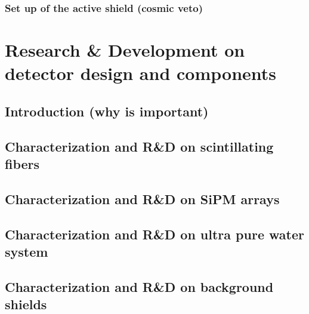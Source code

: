 \documentclass[12pt,a4paper]{book}
\begin{document}
		\subsection[Set up Active veto]{Set up of the active shield (cosmic veto)} %
		\label{subsec:SetUpActiveShield}
		\newpage
					
\chapter[Research \& Development]{Research \& Development on detector design and components}\label{chap:ResearchandDevelopment}
	\section{Introduction (why is important)}
	 \label{sec:IntroCharacterisation}
	\newpage
	
	\section[Characetrization fibers]{Characterization and R\&D on scintillating fibers}
	\label{sec:CharacterizationScintillatingFibers}
	\newpage
		
	\section[Characterization SiPM arrays]{Characterization and R\&D on SiPM arrays}
	\label{sec:CharacterizationSiPM}
	\newpage
	
	\section[Characetrization water system]{Characterization and R\&D on ultra pure water system}
	\label{sec:CharacterizationUltraPureWaterSystem}
	\newpage
		
	\section[Characterization shields]{Characterization and R\&D on background shields}
	\label{sec:RyDBackground}
	
\end{document}
